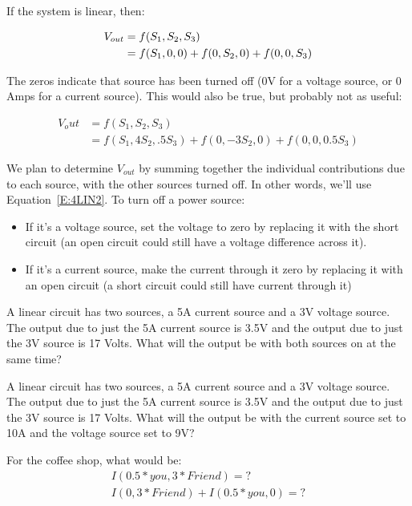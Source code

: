 If the system is linear, then:
\par
\begin{align}
V_{out} &= f(S_1,S_2,S_3) \notag\\
	&= f(S_1,0,0)+f(0,S_2,0)+f(0,0,S_3) \label{E:4LIN2}
\end{align}

The zeros indicate that source has been turned off (0V for a voltage source, or 0 Amps for a current source). This would also be true, but probably not as useful:
\par
\begin{align}
V_out &= f(S_1,S_2,S_3) \\
	&= f(S_1,4S_2,.5S_3)+f(0,-3S_2,0)+f(0,0,0.5S_3)
\end{align}

We plan to determine $V_{out}$ by summing together the individual contributions due to each source, with the other sources turned off. In other words, we'll use Equation~\eqref{E:4LIN2}. To turn off a power source:\

\begin{itemize}
\item If it's a voltage source, set the voltage to zero by replacing it with the short circuit (an open circuit could still have a voltage difference across it).
\item If it's a current source, make the current through it zero by replacing it with an open circuit (a short circuit could still have current through it)
\end{itemize}

\begin{blevel}
A linear circuit has two sources, a 5A current source and a 3V voltage source. The output due to just the 5A current source is 3.5V and the output due to just the 3V source is 17 Volts. What will the output be with both sources on at the same time?
\end{blevel}

\begin{clevel}
A linear circuit has two sources, a 5A current source and a 3V voltage source. The output due to just the 5A current source is 3.5V and the output due to just the 3V source is 17 Volts. What will the output be with the current source set to 10A and the voltage source set to 9V?
\end{clevel}

\begin{alevel}
For the coffee shop, what would be:
\begin{align*}
I(0.5*you,3*Friend)=?\\
I(0,3*Friend)+I(0.5*you,0)=?
\end{align*}
\end{alevel}

